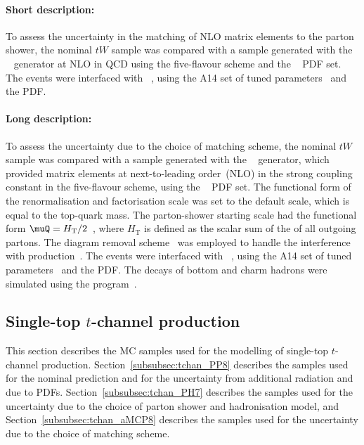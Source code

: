 \paragraph{Short description:}

To assess the uncertainty in the matching of NLO matrix elements to the
parton shower, the nominal $tW$ sample was compared with a sample generated
with the \MGNLO[2.6.2]~\cite{Alwall:2014hca} generator at NLO in QCD using the five-flavour
scheme and the \NNPDF[2.3nlo]~\cite{Ball:2014uwa} PDF set. The events were
interfaced with \PYTHIA[8.230]~\cite{Sjostrand:2014zea}, using the A14
set of tuned parameters~\cite{ATL-PHYS-PUB-2014-021} and the \NNPDF[2.3lo]
PDF.


\paragraph{Long description:}

To assess the uncertainty due to the choice of matching scheme, the nominal $tW$ sample was compared with a sample generated
with the \MGNLO[2.6.2]~\cite{Alwall:2014hca} generator, which provided matrix elements at next-to-leading order~(NLO) in the strong coupling constant \alphas
in the five-flavour scheme, using the \NNPDF[2.3nlo]~\cite{Ball:2014uwa} PDF set.
The functional form of the renormalisation and factorisation scale was set to the default scale, which is equal to the top-quark mass.
The parton-shower starting scale had the functional form $\muQ = H_{\mathrm T}/2$~\cite{ATL-PHYS-PUB-2017-007}, 
where $H_{\mathrm T}$ is defined as the scalar sum of the \pT of all outgoing partons.
The diagram removal scheme~\cite{Frixione:2008yi} was employed to handle the interference with \ttbar production~\cite{ATL-PHYS-PUB-2016-020}.
The events were interfaced with \PYTHIA[8.230]~\cite{Sjostrand:2014zea}, using the A14 set of tuned parameters~\cite{ATL-PHYS-PUB-2014-021} 
and the \NNPDF[2.3lo] PDF.
The decays of bottom and charm hadrons were simulated using the \EVTGEN[1.6.0] program~\cite{Lange:2001uf}.


\subsection{Single-top \texorpdfstring{$t$}{t}-channel production}
\label{subsec:tchan}

This section describes the MC samples used for the modelling of single-top $t$-channel production.
Section~\ref{subsubsec:tchan_PP8} describes the \POWPY[8] samples used for the nominal prediction
and for the uncertainty from additional radiation and due to PDFs.
Section~\ref{subsubsec:tchan_PH7} describes the \POWHER[7] samples used for the uncertainty due to the choice of parton shower and hadronisation model,
and Section~\ref{subsubsec:tchan_aMCP8} describes the \MGNLOPY[8] samples used for the uncertainty due to the choice of matching scheme.

